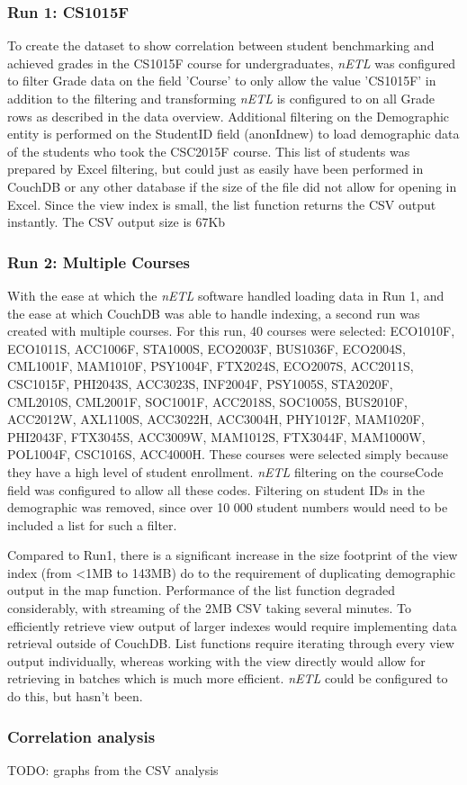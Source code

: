 \subsubsection{Run 1: CS1015F}
To create the dataset to show correlation between student benchmarking and achieved grades in the CS1015F course for undergraduates, \textit{nETL} was configured to filter Grade data on the field 'Course' to only allow the value 'CS1015F' in addition to the filtering and transforming \textit{nETL} is configured to on all Grade rows as described in the data overview. Additional filtering on the Demographic entity is performed on the StudentID field (anonIdnew) to load demographic data of the students who took the CSC2015F course. This list of students was prepared by Excel filtering, but could just as easily have been performed in CouchDB or any other database if the size of the file did not allow for opening in Excel. Since the view index is small, the list function returns the CSV output instantly. The CSV output size is 67Kb

\subsubsection{Run 2: Multiple Courses}
With the ease at which the \textit{nETL} software handled loading data in Run 1, and the ease at which CouchDB was able to handle indexing, a second run was created with multiple courses. For this run, 40 courses were selected: ECO1010F, ECO1011S, ACC1006F, STA1000S, ECO2003F, BUS1036F, ECO2004S, CML1001F, MAM1010F, PSY1004F, FTX2024S, ECO2007S, ACC2011S, CSC1015F, PHI2043S, ACC3023S, INF2004F, PSY1005S, STA2020F, CML2010S, CML2001F, SOC1001F, ACC2018S, SOC1005S, BUS2010F, ACC2012W, AXL1100S, ACC3022H, ACC3004H, PHY1012F, MAM1020F, PHI2043F, FTX3045S, ACC3009W, MAM1012S, FTX3044F, MAM1000W, POL1004F, CSC1016S, ACC4000H. These courses were selected simply because they have a high level of student enrollment. \textit{nETL} filtering on the courseCode field was configured to allow all these codes. Filtering on student IDs in the demographic was removed, since over 10 000 student numbers would need to be included a list for such a filter.

Compared to Run1, there is a significant increase in the size footprint of the view index (from \textless 1MB to 143MB) do to the requirement of duplicating demographic output in the map function. Performance of the list function degraded considerably, with streaming of the 2MB CSV taking several minutes. To efficiently retrieve view output of larger indexes would require implementing data retrieval outside of CouchDB. List functions require iterating through every view output individually, whereas working with the view directly would allow for retrieving in batches which is much more efficient. \textit{nETL} could be configured to do this, but hasn't been.

\subsubsection{Correlation analysis}
TODO: graphs from the CSV analysis